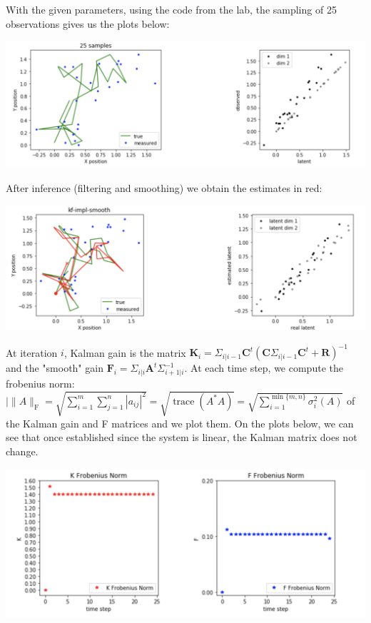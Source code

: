 \documentclass[12pt]{article}
\newcommand{\matr}[1]{\bm{#1}}     %
\begin{document}
With the given parameters, using the code from the lab, the sampling of 25 observations gives us the plots below:
\begin{center}
	\includegraphics[width=1\linewidth]{figures/problem_4_1.png} 
\end{center}

After inference (filtering and smoothing) we obtain the estimates in red:
\begin{center}
	\includegraphics[width=1\linewidth]{figures/problem_4_2.png} 
\end{center}

At iteration $i$, Kalman gain is the matrix $\mathbf{K}_i = \Sigma_{i|i-1} \matr{C}^t (\matr{C} \Sigma_{i|i-1}\matr{C}^t  + \matr{R})^{-1}$ and the "smooth" gain $\mathbf{F}_i = 
\Sigma_{i|i} \matr{A}^t \Sigma_{i+1|i}^{-1}$.
At each time step, we compute the frobenius norm: $|\|A\|_{\mathrm{F}}=\sqrt{\sum_{i=1}^{m} \sum_{j=1}^{n}\left|a_{i j}\right|^{2}}=\sqrt{\operatorname{trace}\left(A^{*} A\right)}=\sqrt{\sum_{i=1}^{\min \{m, n\}} \sigma_{i}^{2}(A)}$ 
of the Kalman gain and F matrices and we plot them. On the plots below, we can see that once established since the system is linear, the Kalman matrix does not change.
\begin{center}
	\includegraphics[width=1\linewidth]{figures/problem_4_3.png} 
\end{center}
\end{document}
